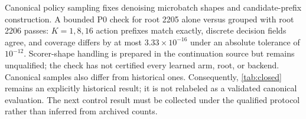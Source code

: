 Canonical policy sampling fixes denoising microbatch shapes and candidate-prefix construction. A bounded P0 check for root 2205 alone versus grouped with root 2206 passes: $K=1,8,16$ action prefixes match exactly, discrete decision fields agree, and coverage differs by at most $3.33\times10^{-16}$ under an absolute tolerance of $10^{-12}$. Scorer-shape handling is prepared in the continuation source but remains unqualified; the check has not certified every learned arm, root, or backend. Canonical samples also differ from historical ones. Consequently, \cref{tab:closed} remains an explicitly historical result; it is not relabeled as a validated canonical evaluation. The next control result must be collected under the qualified protocol rather than inferred from archived counts.
